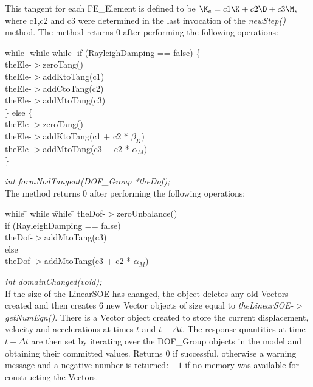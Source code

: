 This tangent for each FE\_Element is defined to be $\K_e = c1 \K + c2
\D + c3 \M$, where c1,c2 and c3 were determined in the last invocation
of the {\em newStep()} method.  The method returns $0$ after
performing the following operations:
\begin{tabbing}
while \= \+ while \= while \= \kill
if (RayleighDamping == false) \{ \+ \\
theEle-$>$zeroTang() \\
theEle-$>$addKtoTang(c1) \\
theEle-$>$addCtoTang(c2) \\
theEle-$>$addMtoTang(c3)  \- \\
\} else \{ \+ \\
theEle-$>$zeroTang() \\
theEle-$>$addKtoTang(c1 + c2 * $\beta_K$) \\
theEle-$>$addMtoTang(c3 + c2 * $\alpha_M$)  \- \\ 
\}
\end{tabbing}



{\em int formNodTangent(DOF\_Group *theDof);} \\
The method returns $0$ after performing the following operations:
\begin{tabbing}
while \= \+ while \= while \= \kill
theDof-$>$zeroUnbalance() \\
if (RayleighDamping == false)  \+ \\
theDof-$>$addMtoTang(c3)  \- \\
else \+ \\
theDof-$>$addMtoTang(c3 + c2 * $\alpha_M$)  \- \\ 
\end{tabbing}


{\em int domainChanged(void);}\\
If the size of the LinearSOE has changed, the object deletes any old Vectors
created and then creates $6$ new Vector objects of size equal to {\em
theLinearSOE-$>$getNumEqn()}. There is a Vector object created to store
the current displacement, velocity and accelerations at times $t$ and
$t + \Delta t$. The response quantities at time $t + \Delta t$ are
then set by iterating over the DOF\_Group objects in the model and
obtaining their committed values. 
Returns $0$ if successful, otherwise a warning message and a negative
number is returned: $-1$ if no memory was available for constructing
the Vectors. \\

